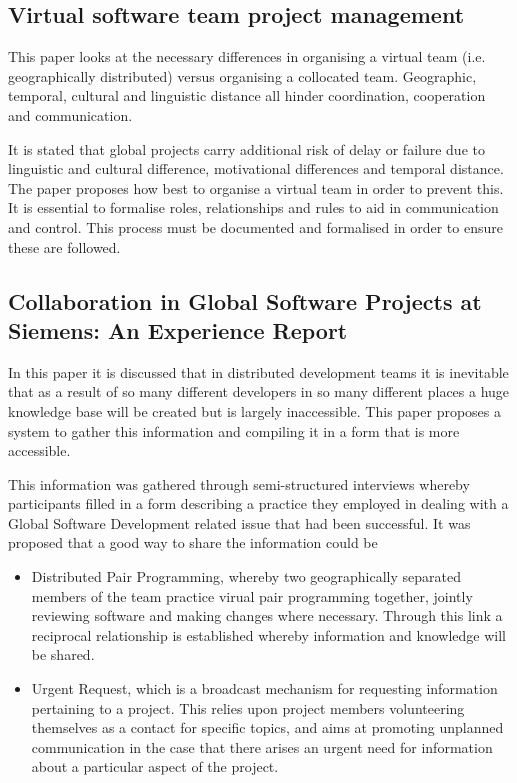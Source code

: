 \documentclass{l4proj}
\begin{document}
\subsection {Virtual software team project management}

This paper looks at the necessary differences in organising a virtual team (i.e. geographically distributed) versus organising a collocated team.  Geographic, temporal, cultural and linguistic distance all hinder coordination, cooperation and communication. 

It is stated that global projects carry additional risk of delay or failure due to linguistic and cultural difference, motivational differences and temporal distance.  The paper proposes how best to organise a virtual team in order to prevent this.  It is essential to formalise roles, relationships and rules to aid in communication and control.  This process must be documented and formalised in order to ensure these are followed. 


 

\subsection {Collaboration in Global Software Projects at Siemens: An Experience Report}

In this paper it is discussed that in distributed development teams it is inevitable that as a result of so many different developers in so many different places a huge knowledge base will be created but is largely inaccessible.  This paper proposes a system to gather this information and compiling it in a form that is more accessible.

This information was gathered through semi-structured interviews whereby participants filled in a form describing a practice they employed in dealing with a Global Software Development related issue that had been successful.  It was proposed that a good way to share the information could be

\begin{itemize}
\item Distributed Pair Programming, whereby two geographically separated members of the team practice virual pair programming together, jointly reviewing software and making changes where necessary.  Through this link a reciprocal relationship is established whereby information and knowledge will be shared.
\item Urgent Request, which is a broadcast mechanism for requesting information pertaining to a project.  This relies upon project members volunteering themselves as a contact for specific topics, and aims at promoting unplanned communication in the case that there arises an urgent need for information about a particular aspect of the project.
\end{itemize}
\end{document}
